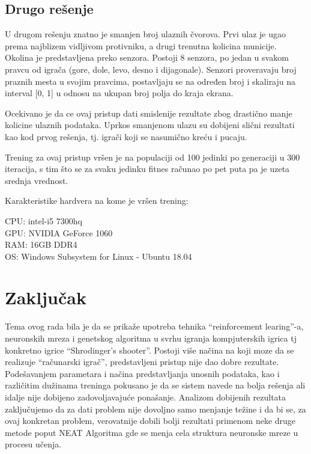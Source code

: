 \documentclass[a4paper]{article}
\begin{document}
\subsection {Drugo rešenje}
\par U drugom rešenju znatno je smanjen broj ulaznih čvorova. Prvi ulaz je ugao prema najblizem vidljivom protivniku, a drugi trenutna kolicina municije. Okolina je predstavljena preko senzora. Postoji 8 senzora, po jedan u svakom pravcu od igrača (gore, dole, levo, desno i dijagonale).  Senzori proveravaju broj praznih mesta u svojim pravcima,  postavljaju se na određen broj i skaliraju na interval [0, 1] u odnosu na ukupan broj polja do kraja ekrana. 

Ocekivano je da ce ovaj pristup dati smislenije rezultate zbog drastično manje kolicine ulaznih podataka. Uprkos smanjenom ulazu su dobijeni slični rezultati kao kod prvog rešenja, tj. igrači koji se nasumično kreću i pucaju.

Trening za ovaj pristup vršen je na populaciji od 100 jedinki po generaciji u 300 iteracija, s tim što se za svaku jedinku fitnes računao po pet puta pa je uzeta srednja vrednost.
\newline
\begin{tcolorbox}
\begin {center}
Karakteristike hardvera na kome je vršen trening: \\
\end {center}
CPU: intel-i5 7300hq \\
GPU: NVIDIA GeForce 1060 \\
RAM: 16GB DDR4 \\
OS: Windows Subsystem for Linux - Ubuntu 18.04 \\
\end{tcolorbox}


 \newpage
\section{Zaključak}
\label{sec:zakljucak}

\par Tema ovog rada bila je da se prikaže upotreba tehnika “reinforcement learing”-a,  neuronskih mreza i genetskog algoritma u svrhu igranja kompjuterskih igrica tj konkretno igrice “Shrodinger's shooter”. Postoji više načina na koji moze da se realizuje “računarski igrač”,  predstavljeni pristup nije dao dobre rezultate. Podešavanjem parametara i načina predstavljanja unosnih podataka, kao i različitim dužinama treninga pokusano je da se sistem navede na bolja rešenja ali idalje nije dobijeno zadovoljavajuće ponašanje. Analizom dobijenih rezultata zaključujemo da za dati problem nije dovoljno samo menjanje težine i da bi se, za ovaj konkretan problem, verovatnije dobili bolji rezultati primenom neke druge metode poput NEAT\cite{neat}  Algoritma gde se menja cela struktura neuronske mreze u procesu učenja.
\end{document}
